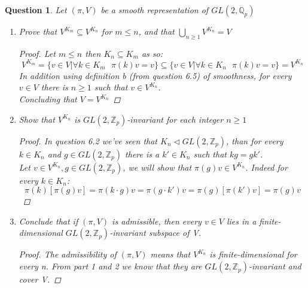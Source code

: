 \documentclass[11pt]{article}
\newtheorem{quest}[thm]{Question}
\theoremstyle{definition}
\theoremstyle{lemma}
\theoremstyle{conclusion}
\def\zint{\mathbb{Z}}
\def\zp{\zint_{p}}
\def\qp{\mathbb{Q}_{p}}
\def\gl#1{GL(2, #1)}
\def\glzp{\gl{\zp}}
\def\glqp{\gl{\qp}}
\numberwithin{equation}{section}
\begin{document}
\begin{quest}%
Let $(\pi, V)$ be a smooth representation of $\glqp$
\begin{enumerate}
\item Prove that $V^{K_m} \subseteq V^{K_n}$ for $m \leq n$, and that $\bigcup_{n \geq 1} V^{K_n} = V$
\begin{proof}
Let $m \leq n$ then $K_n \subseteq K_m$ as so:
$$ V^{K_m} = \{v \in V | \forall k \in K_m \textbf{ } \pi(k)v=v\} \subseteq \{v \in V | \forall k \in K_n \textbf{ } \pi(k)v=v\} = V^{K_n}$$
In addition using definition b (from question 6.5) of smoothness, for every $v \in V$ there is $n \geq 1$ such that $v \in V^{K_n}$. 
\\Concluding that $V = V^{K_n}$
\end{proof}


\item Show that $V^{K_n}$ is $\glzp$-invariant for each integer $n \geq1$
\begin{proof}
In question 6.2 we've seen that $K_n \lhd \glzp$, than for every $k \in K_n$ and $g \in \glzp$ there is a $k' \in K_n$ such that $kg = gk'$.
\\Let $v \in V^{K_n}, g \in \glzp$, we will show that $\pi(g)v \in V^{K_n}$. Indeed for every $k \in K_n$: 
$$ \pi(k)[\pi(g)v] = \pi(k \cdot g) v = \pi(g \cdot k')v = \pi(g) [\pi(k')v] = \pi(g)v$$ 
\end{proof}
\item Conclude that if $(\pi, V)$ is admissible, then every $v \in V$ lies in a finite-dimensional $\glzp$-invariant subspace of V.
\begin{proof}
The admissibility of $(\pi, V)$ means that $V^{K_n}$ is finite-dimensional for every n. From part 1 and 2 we know that they are $\glzp$-invariant and cover V. 
\end{proof}

\end{enumerate}
\end{quest}
\end{document}
